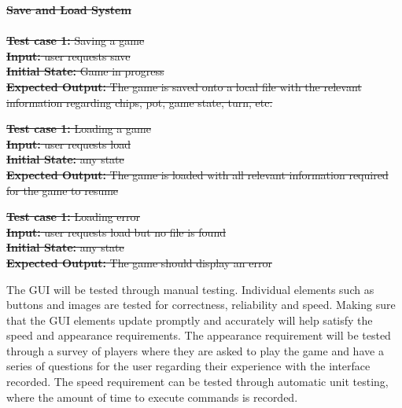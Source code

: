 \documentclass[12pt]{article}
\begin{document}
	\sout{\noindent \textbf{Save and Load System} \\
	\\
	\noindent \textbf{Test case 1:} Saving a game\\
	\textbf{Input:} user requests save\\
	\textbf{Initial State:} Game in progress\\
	\textbf{Expected Output:} The game is saved onto a local file with the relevant information regarding chips, pot, game state, turn, etc. }
	
	\sout{\noindent \textbf{Test case 1:} Loading a game\\
	\textbf{Input:} user requests load\\
	\textbf{Initial State:} any state\\
	\textbf{Expected Output:} The game is loaded with all relevant information required for the game to resume}
	
	\sout{\noindent \textbf{Test case 1:} Loading error\\
	\textbf{Input:} user requests load but no file is found\\
	\textbf{Initial State:} any state \\
	\textbf{Expected Output:} The game should display an error \\}

The GUI will be tested through manual testing. Individual elements such as buttons and images are tested for correctness, reliability and speed. Making sure that the GUI elements update promptly and accurately will help satisfy the speed and appearance requirements. The appearance requirement will be tested through a survey of players where they are asked to play the game and have a series of questions for the user regarding their experience with the interface recorded. The speed requirement can be tested through automatic unit testing, where the amount of time to execute commands is recorded. 

	
\end{document}
